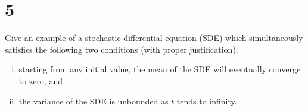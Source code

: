 \section{5}

Give an example of a stochastic differential equation (SDE) which simultaneously satisfies the following two conditions (with proper justification):

\begin{enumerate}[(i)]
	\item starting from any initial value, the mean of the SDE will eventually converge to zero, and
	\item the variance of the SDE is unbounded as $t$ tends to infinity.
\end{enumerate}

